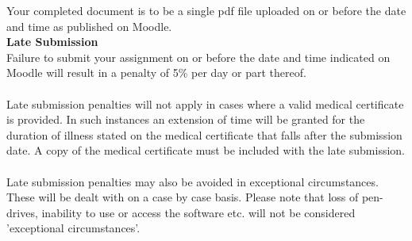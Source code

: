 Your completed document is to be a single pdf file uploaded on or before the date and time as published on Moodle.\\

\vspace{1cm}
\textbf{Late Submission}\\
Failure to submit your assignment on or before the date and time indicated on Moodle will result in a penalty of 5\% per day or part thereof.
\\
\\
Late submission penalties will not apply in cases where a valid medical certificate is provided.  In such instances an extension of time will be granted for the duration of illness stated on the medical certificate that falls after the submission date.  A copy of the medical certificate must be included with the late submission.
\\
\\
Late submission penalties may also be avoided in exceptional circumstances.  These will be dealt with on a case by case basis.  Please note that loss of pen-drives, inability to use or access the software etc. will not be considered 'exceptional circumstances'.